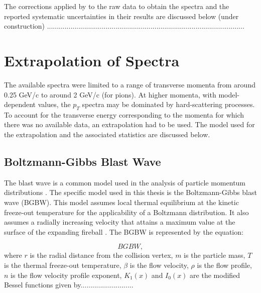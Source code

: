 The corrections applied by \citet{PhysRevC.96.044904} to the raw data to obtain the spectra and the reported systematic uncertainties in their results are discussed below (under construction)
.....................................................................................................

\section{Extrapolation of Spectra}
The available spectra were limited to a range of transverse momenta from around 0.25 GeV/c to around 2 GeV/c (for pions). At higher momenta, with model-dependent values, the $p_{T}$ spectra may be dominated by hard-scattering processes. To account for the transverse energy corresponding to the momenta for which there was no available data, an extrapolation had to be used. The model used for the extrapolation and the associated statistics are discussed below.

\subsection{Boltzmann-Gibbs Blast Wave}
% 
The blast wave is a common model used in the analysis of particle momentum distributions \cite{Tang:2008ud,Tripathy:2017kwb,PhysRevC.96.044904}. The specific model used in this thesis is the Boltzmann-Gibbs blast wave (BGBW). This model assumes local thermal equilibrium at the kinetic freeze-out temperature for the applicability of a Boltzmann distribution. It also assumes a radially increasing velocity that attains a maximum value at the surface of the expanding fireball \cite{Tripathy:2017kwb}. The BGBW is represented by the equation: %

	\begin{equation}\label{eqn:BGBW}
	BGBW,
	\end{equation}
where $r$ is the radial distance from the collision vertex, $m$ is the particle mass, $T$ is the thermal freeze-out temperature, $\beta$ is the flow velocity, $\rho$ is the flow profile, $n$ is the flow velocity profile exponent, $K_{1}(x)$ and $I_{0}(x)$ are the modified Bessel functions given by...........................



